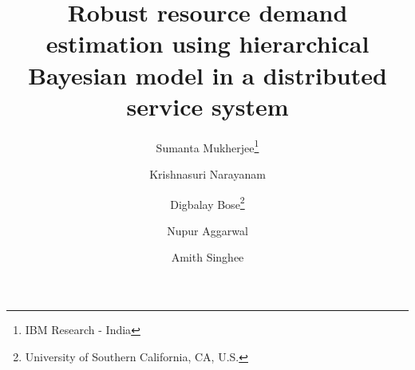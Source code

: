 \documentclass[twoside,leqno,twocolumn]{article}
\begin{document}
\makeatletter
\def\BState{\State\hskip-\ALG@thistlm}
\makeatother

\newcommand*\samethanks[1][\value{footnote}]{\footnotemark[#1]}
\title{\Large Robust resource demand estimation using hierarchical Bayesian model in a distributed service system}
\author{ {Sumanta Mukherjee\thanks{IBM Research - India}} \\
\and
{ Krishnasuri Narayanam\samethanks}  \\
\and
{Digbalay Bose\thanks{University of Southern California, CA, U.S.}}   \\
\and 
{Nupur Aggarwal\samethanks[1]} \\
\and
{Amith Singhee\samethanks[1]}
}

\date{}

\maketitle







\end{document}
